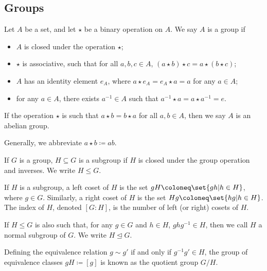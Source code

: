 \subsection{Groups}%
\begin{definition}[Groups]
  Let $A$ be a set, and let $\star$ be a binary operation on $A$. We say $A$ is a group if
  \begin{itemize}
    \item $A$ is closed under the operation $\star$;
    \item $\star$ is associative, such that for all $a,b,c\in A$, $\left(a\star b\right)\star c = a\star \left(b\star c\right)$;
    \item $A$ has an identity element $e_A$, where $a\star e_A = e_A\star a = a$ for any $a\in A$;
    \item for any $a\in A$, there exists $a^{-1}\in A$ such that $a^{-1}\star a = a\star a^{-1} = e$.
  \end{itemize}
  If the operation $\star$ is such that $a\star b = b\star a$ for all $a,b\in A$, then we say $A$ is an abelian group.\newline

  Generally, we abbreviate $a\star b \coloneq ab$.
\end{definition}
\begin{definition}
  If $G$ is a group, $H\subseteq G$ is a subgroup if $H$ is closed under the group operation and inverses. We write $H\leq G$.\newline

  If $H$ is a subgroup, a left coset of $H$ is the set $gH \coloneq \set{gh | h\in H}$, where $g\in G$. Similarly, a right coset of $H$ is the set $Hg\coloneq \set{hg | h\in H}$. The index of $H$, denoted $\left[G:H\right]$, is the number of left (or right) cosets of $H$.\newline

  If $H\leq G$ is also such that, for any $g\in G$ and $h\in H$, $ghg^{-1}\in H$, then we call $H$ a normal subgroup of $G$. We write $H\trianglelefteq G$.\newline

  Defining the equivalence relation $g\sim g'$ if and only if $g^{-1}g'\in H$, the group of equivalence classes $gH\coloneq \left[g\right]$ is known as the quotient group $G/H$.
\end{definition}
